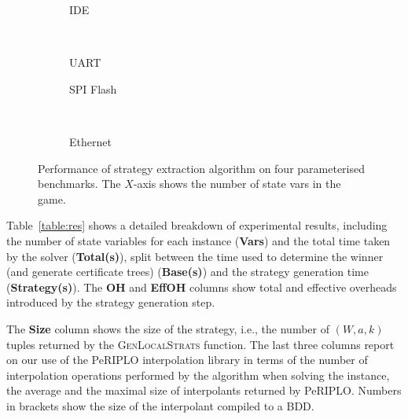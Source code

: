 \begin{figure}
\centering
\small
\begin{subfigure}{.5\linewidth}
  \centering
  \caption{IDE}
  \label{fig:sub1}
\end{subfigure}%
~
\begin{subfigure}{.5\linewidth}
  \centering
  \caption{UART}
  \label{fig:sub2}
\end{subfigure}
\begin{subfigure}{.5\linewidth}
  \centering
  \caption{SPI Flash}
  \label{fig:sub1}
\end{subfigure}%
~
\begin{subfigure}{.5\linewidth}
  \centering
  \caption{Ethernet}
  \label{fig:sub2}
\end{subfigure}
\vspace{-3mm}
\caption{Performance of strategy extraction algorithm on four parameterised benchmarks.
The $X$-axis shows the number of state vars in the game.}
\vspace{-4mm}
\label{f:graphs}
\end{figure}

Table~\ref{table:res} shows a detailed breakdown of
experimental results, including the number of state variables for
each instance (\textbf{Vars}) and the total time taken by the
solver (\textbf{Total(s)}), split between the time used to 
determine the winner (and generate certificate trees) 
(\textbf{Base(s)}) and the strategy generation time 
(\textbf{Strategy(s)}).  The \textbf{OH} and \textbf{EffOH} 
columns show total and effective overheads introduced by the 
strategy generation step.

The \textbf{Size} column shows the size of the strategy, i.e., the 
number of $(W,a,k)$ tuples returned by the \textsc{GenLocalStrats}
function.  The last three columns report on our use of the PeRIPLO 
interpolation library in terms of the number of interpolation 
operations performed by the algorithm when solving the instance, 
the average and the maximal size of interpolants returned by 
PeRIPLO.  Numbers in brackets show the size of the interpolant 
compiled to a BDD.


